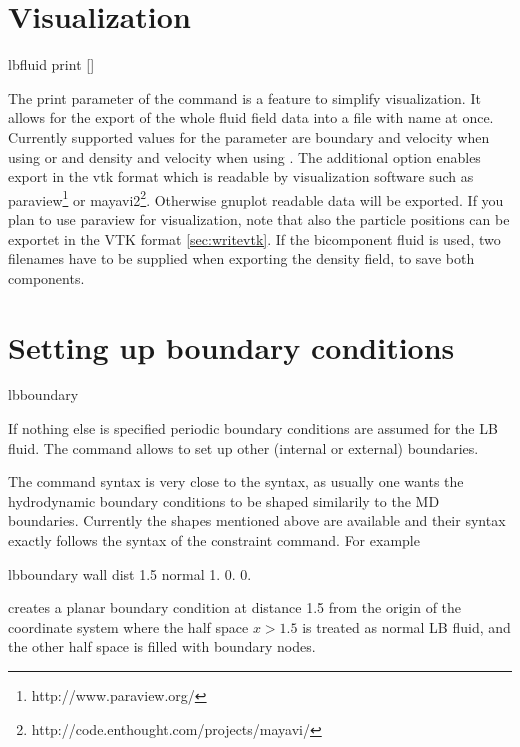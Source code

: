 \section{Visualization}
\label{ssec:LBvisualization}
\begin{essyntax}
  lbfluid print    []
\end{essyntax}
The print parameter of the  command is a feature to simplify visualization. It allows for the export of the whole fluid field data into a 
file with name  at once. Currently supported values for the 
parameter  are boundary and velocity when using  or  and density and velocity when using . The additional option 
 enables export in the vtk format which is readable by visualization software such as paraview\footnote{http://www.paraview.org/} or mayavi2\footnote{http://code.enthought.com/projects/mayavi/}. Otherwise gnuplot readable data will be 
exported. If you plan to use paraview for visualization, note that also the 
particle positions can be exportet in the VTK format \ref{sec:writevtk}.
If the  bicomponent fluid is used, two filenames have to be supplied when exporting the density field, to save both components.

\section{Setting up boundary conditions}
\begin{essyntax}
  lbboundary   
  \begin{features}
  \end{features}
\end{essyntax}

If nothing else is specified periodic boundary conditions are assumed 
for the LB fluid. The  command allows to set up
other (internal or external) boundaries.

The  command syntax is very close to the
 syntax, as usually one wants the hydrodynamic
boundary conditions to be shaped similarily to the MD
boundaries. Currently the shapes mentioned above are available and
their syntax exactly follows the syntax of the constraint command. For
example
\begin{tclcode}
  lbboundary wall dist 1.5 normal 1. 0. 0. 
\end{tclcode}
creates a planar boundary condition at distance 1.5 from the origin of
the coordinate system where the half space $x>1.5$ is treated as
normal LB fluid, and the other half space is filled with boundary
nodes.

